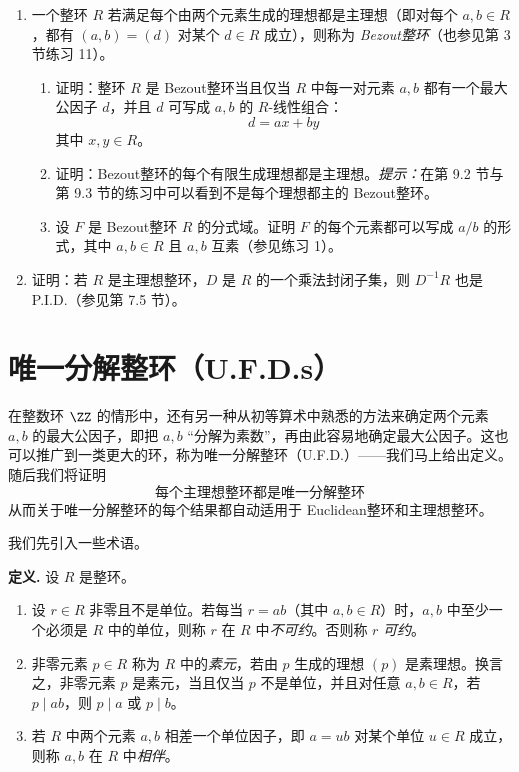 \begin{enumerate}[label=\arabic*.]
	\item 一个整环 $R$ 若满足每个由两个元素生成的理想都是主理想（即对每个 $a,b\in R$，都有 $(a,b)=(d)$ 对某个 $d\in R$ 成立），则称为 \emph{Bezout整环}（也参见第 3 节练习 11）。
	\begin{enumerate}[label=(\alph*)]
		\item 证明：整环 $R$ 是 Bezout整环当且仅当 $R$ 中每一对元素 $a,b$ 都有一个最大公因子 $d$，并且 $d$ 可写成 $a,b$ 的 $R$-线性组合：
		\[
		d=ax+by
		\]
		其中 $x,y\in R$。
		\item 证明：Bezout整环的每个有限生成理想都是主理想。\emph{提示：}在第 9.2 节与第 9.3 节的练习中可以看到不是每个理想都主的 Bezout整环。
		\item 设 $F$ 是 Bezout整环 $R$ 的分式域。证明 $F$ 的每个元素都可以写成 $a/b$ 的形式，其中 $a,b\in R$ 且 $a,b$ 互素（参见练习 1）。
	\end{enumerate}
	
	\item 证明：若 $R$ 是主理想整环，$D$ 是 $R$ 的一个乘法封闭子集，则 $D^{-1}R$ 也是 P.I.D.（参见第 7.5 节）。
\end{enumerate}


\section{唯一分解整环（U.F.D.s）}

在整数环 $\ZZ$ 的情形中，还有另一种从初等算术中熟悉的方法来确定两个元素 $a,b$ 的最大公因子，即把 $a,b$ “分解为素数”，再由此容易地确定最大公因子。这也可以推广到一类更大的环，称为唯一分解整环（U.F.D.）——我们马上给出定义。随后我们将证明
\[
\text{每个主理想整环都是唯一分解整环}
\]
从而关于唯一分解整环的每个结果都自动适用于 Euclidean整环和主理想整环。

我们先引入一些术语。

\medskip
\noindent\textbf{定义.}
设 $R$ 是整环。
\begin{enumerate}[label=(\arabic*)]
	\item 设 $r\in R$ 非零且不是单位。若每当 $r=ab$（其中 $a,b\in R$）时，$a,b$ 中至少一个必须是 $R$ 中的单位，则称 $r$ 在 $R$ 中\emph{不可约}。否则称 $r$ \emph{可约}。
	\item 非零元素 $p\in R$ 称为 $R$ 中的\emph{素元}，若由 $p$ 生成的理想 $(p)$ 是素理想。换言之，非零元素 $p$ 是素元，当且仅当 $p$ 不是单位，并且对任意 $a,b\in R$，若 $p\mid ab$，则 $p\mid a$ 或 $p\mid b$。
	\item 若 $R$ 中两个元素 $a,b$ 相差一个单位因子，即 $a=ub$ 对某个单位 $u\in R$ 成立，则称 $a,b$ 在 $R$ 中\emph{相伴}。
\end{enumerate}

